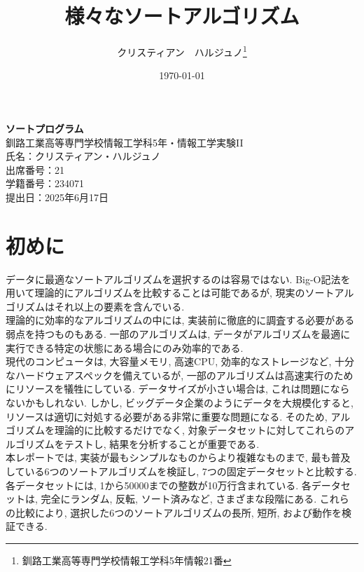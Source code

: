 \documentclass[a4j, 11pt]{jarticle}
\title{様々なソートアルゴリズム}
\author{クリスティアン　ハルジュノ\thanks{釧路工業高等専門学校情報工学科5年情報21番}}
\date{\today}
\begin{document}
\begin{titlepage}
  \centering
  \vspace*{3cm}

  {\fontsize{25pt}{36pt}\selectfont\bfseries ソートプログラム} \\[1cm]  %
  {\Large 釧路工業高等専門学校情報工学科5年・情報工学実験II} \\[1cm]
  {\large 氏名：クリスティアン・ハルジュノ} \\[1cm]
  {\large 出席番号：21} \\[1cm]
  {\large 学籍番号：234071} \\[5cm]


  {\Large 提出日：2025年6月17日} \\

  \vfill

\end{titlepage}
\tableofcontents
\newpage
\setcounter{page}{1}
\section{初めに}
データに最適なソートアルゴリズムを選択するのは容易ではない. Big-O記法を用いて理論的にアルゴリズムを比較することは可能であるが, 現実のソートアルゴリズムはそれ以上の要素を含んでいる. \\

理論的に効率的なアルゴリズムの中には, 実装前に徹底的に調査する必要がある弱点を持つものもある. 一部のアルゴリズムは, データがアルゴリズムを最適に実行できる特定の状態にある場合にのみ効率的である. \\

現代のコンピュータは, 大容量メモリ, 高速CPU, 効率的なストレージなど, 十分なハードウェアスペックを備えているが, 一部のアルゴリズムは高速実行のためにリソースを犠牲にしている. データサイズが小さい場合は, これは問題にならないかもしれない. しかし, ビッグデータ企業のようにデータを大規模化すると, リソースは適切に対処する必要がある非常に重要な問題になる. そのため, アルゴリズムを理論的に比較するだけでなく, 対象データセットに対してこれらのアルゴリズムをテストし, 結果を分析することが重要である. \\

本レポートでは, 実装が最もシンプルなものからより複雑なものまで, 最も普及している6つのソートアルゴリズムを検証し, 7つの固定データセットと比較する. 各データセットには, 1から50000までの整数が10万行含まれている. 各データセットは, 完全にランダム, 反転, ソート済みなど, さまざまな段階にある. これらの比較により, 選択した6つのソートアルゴリズムの長所, 短所, および動作を検証できる. \\
\end{document}
